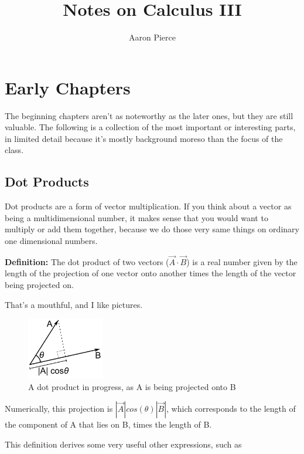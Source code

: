 \documentclass[12pt, letterpaper]{article}
\title{Notes on Calculus III}
\author{Aaron Pierce}
\date{} %
\begin{document}
\maketitle

\tableofcontents

\newpage

\section{Early Chapters}

The beginning chapters aren't as noteworthy as the later ones, but they are still valuable. 
The following is a collection of the most important or interesting parts, in limited detail because it's mostly background moreso than the focus of the class.

\subsection{Dot Products}
Dot products are a form of vector multiplication.
If you think about a vector as being a multidimensional number, it makes sense that you would want to multiply or add them together, because we do those very same things on ordinary one dimensional numbers.

\textbf{Definition:} The dot product of two vectors ($\vec{A} \cdot \vec{B}$) is a real number given by the length of the projection of one vector onto another 
times the length of the vector being projected on.

That's a mouthful, and I like pictures.

\begin{figure}[h]
    \centering 
    \includegraphics[width=0.30\textwidth]{dotproduct}
    \caption{A dot product in progress, as A is being projected onto B}
\end{figure}

Numerically, this projection is $|\vec{A}| cos(\theta) |\vec{B}|$, which corresponds to the length of the component of A that lies on B, times the length of B.

This definition derives some very useful other expressions, such as 
\end{document}

